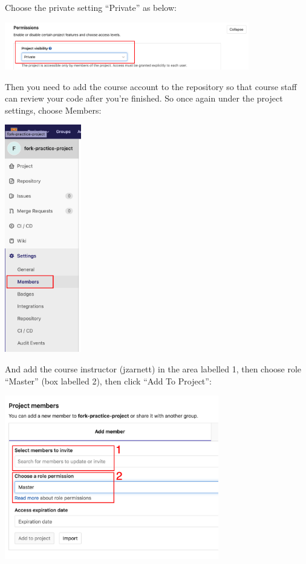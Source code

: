 Choose the private setting ``Private'' as below:

\begin{center}
	\includegraphics[width=0.8\textwidth]{images/gitlab-private.png}
\end{center}

Then you need to add the course account to the repository so that course staff can review your code after you're finished. So once again under the project settings, choose Members:

\begin{center}
	\includegraphics[width=0.25\textwidth]{images/gitlab-members.png}
\end{center}

And add the course instructor (jzarnett) in the area labelled 1, then choose role ``Master'' (box labelled 2), then click ``Add To Project'':

\begin{center}
	\includegraphics[width=0.7\textwidth]{images/gitlab-member-add.png}
\end{center}

